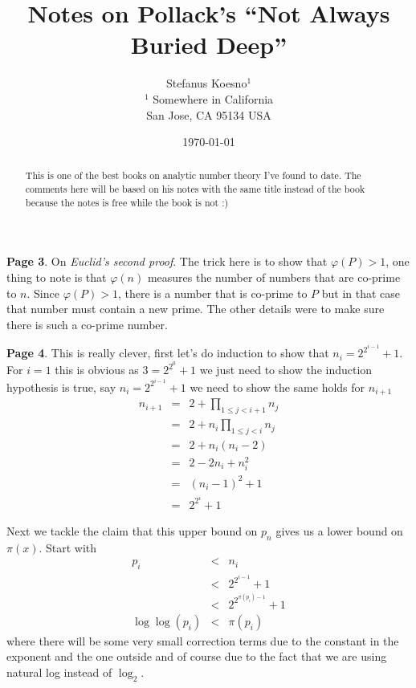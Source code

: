 \documentclass[aps,preprint,preprintnumbers,nofootinbib,showpacs,prd]{revtex4-1}
\newcommand{\nbea}{\begin{eqnarray*}}
\newcommand{\neea}{\end{eqnarray*}}
\begin{document}
\title{Notes on Pollack's ``Not Always Buried Deep''}
\bigskip
\author{Stefanus Koesno$^1$\\
$^1$ Somewhere in California\\ San Jose, CA 95134 USA\\
}
%
\date{\today}
%
\begin{abstract}
This is one of the best books on analytic number theory I've found to date. The comments here will be based on his notes with the same title instead of the book because the notes is free while the book is not :)

\end{abstract}
%
\maketitle

\renewcommand{\theequation}{A.\arabic{equation}}  %
\setcounter{equation}{0}  %

{\bf Page 3}. On {\it Euclid's second proof}. The trick here is to show that $\varphi(P) > 1$, one thing to note is that $\varphi(n)$ measures the number of numbers that are co-prime to $n$. Since $\varphi(P) > 1$, there is a number that is co-prime to $P$ but in that case that number must contain a new prime. The other details were to make sure there is such a co-prime number.

{\bf Page 4}. This is really clever, first let's do induction to show that $n_i = 2^{2^{i-1}} + 1$. For $i = 1$ this is obvious as $3 = 2^{2^0} + 1$ we just need to show the induction hypothesis is true, say $n_i = 2^{2^{i-1}} + 1$ we need to show the same holds for $n_{i+1}$
%
\nbea
n_{i+1} & = & 2 + \prod_{1 \le j < i+1} n_j \\
& = & 2 + n_i\prod_{1 \le j < i} n_j \\
& = & 2 + n_i(n_i - 2) \\
& = & 2  - 2n_i + n_i^2 \\
& = & (n_i - 1)^2 + 1 \\
& = & 2^{2^{i}} + 1
\neea
%

Next we tackle the claim that this upper bound on $p_n$ gives us a lower bound on $\pi(x)$. Start with
%
\nbea
p_i & < & n_i \\
& < & 2^{2^{i-1}} + 1 \\
& < & 2^{2^{\pi(p_i)-1}} + 1 \\
\log \log (p_i) & < & \pi(p_i)
\neea
%
where there will be some very small correction terms due to the constant in the exponent and the one outside and of course due to the fact that we are using natural log instead of $\log_2$.
\end{document}
